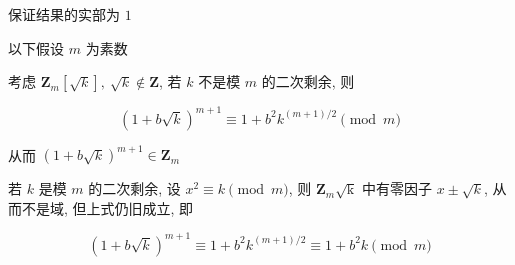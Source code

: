 保证结果的实部为 \(1\)

以下假设 \(m\) 为素数

考虑 \(\mathbf{Z}_m\left[\sqrt{k}\right],~\sqrt{k}\notin \mathbf{Z}\), 若 \(k\) 不是模 \(m\) 的二次剩余, 则

\[
    \left(1+b\sqrt{k}\right)^{m+1}\equiv 1+b^2 k^{(m+1)/2} \pmod m
\]

从而 \(\left(1+b\sqrt{k}\right)^{m+1}\in\mathbf{Z}_m\)

若 \(k\) 是模 \(m\) 的二次剩余, 设 \(x^2\equiv k\pmod m\), 则 \(\mathbf{Z}_m\mathrm{\sqrt{k}}\) 中有零因子 \(x\pm\sqrt{k}\), 从而不是域, 但上式仍旧成立, 即

\[
    \left(1+b\sqrt{k}\right)^{m+1}\equiv 1+b^2 k^{(m+1)/2}\equiv 1+b^2k \pmod m
\]
